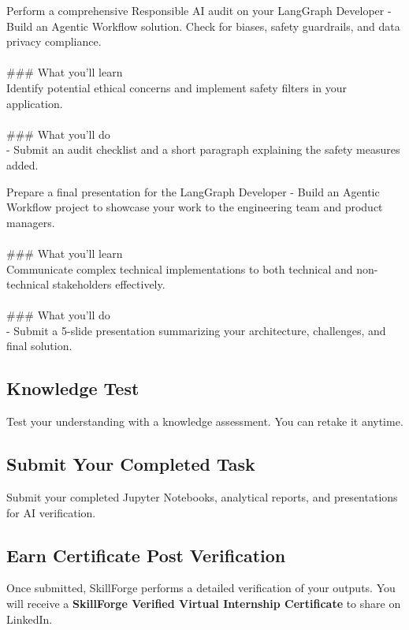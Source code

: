 \documentclass{article}
\begin{document}
Perform a comprehensive Responsible AI audit on your LangGraph Developer - Build an Agentic Workflow solution. Check for biases, safety guardrails, and data privacy compliance. \\
 \\
### What you'll learn \\
Identify potential ethical concerns and implement safety filters in your application. \\
 \\
### What you'll do \\
- Submit an audit checklist and a short paragraph explaining the safety measures added.

Prepare a final presentation for the LangGraph Developer - Build an Agentic Workflow project to showcase your work to the engineering team and product managers. \\
 \\
### What you'll learn \\
Communicate complex technical implementations to both technical and non-technical stakeholders effectively. \\
 \\
### What you'll do \\
- Submit a 5-slide presentation summarizing your architecture, challenges, and final solution.

\subsection*{Knowledge Test}
Test your understanding with a knowledge assessment. You can retake it anytime.\\

\subsection*{Submit Your Completed Task}
Submit your completed Jupyter Notebooks, analytical reports, and presentations for AI verification.\\

\subsection*{Earn Certificate Post Verification}
Once submitted, SkillForge performs a detailed verification of your outputs. You will receive a \textbf{SkillForge Verified Virtual Internship Certificate} to share on LinkedIn.\\
\end{document}
